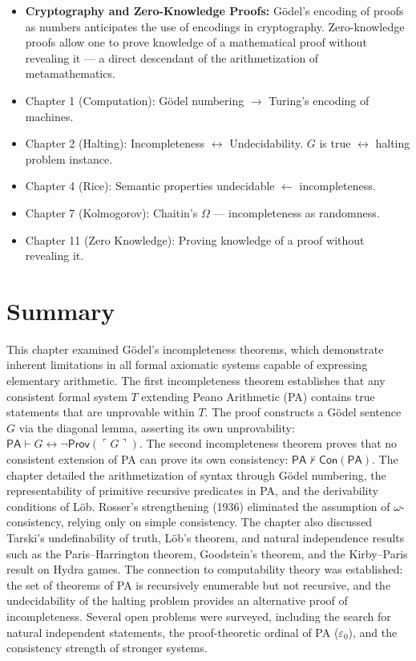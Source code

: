 \begin{itemize}
\item \textbf{Cryptography and Zero-Knowledge Proofs:} Gödel's encoding of proofs as numbers anticipates the use of encodings in cryptography. Zero-knowledge proofs allow one to prove knowledge of a mathematical proof without revealing it --- a direct descendant of the arithmetization of metamathematics.
\end{itemize}

\begin{itemize}
\item Chapter 1 (Computation): Gödel numbering $\to$ Turing's encoding of machines.
\item Chapter 2 (Halting): Incompleteness $\leftrightarrow$ Undecidability. $G$ is true $\leftrightarrow$ halting problem instance.
\item Chapter 4 (Rice): Semantic properties undecidable $\leftarrow$ incompleteness.
\item Chapter 7 (Kolmogorov): Chaitin's $\Omega$ --- incompleteness as randomness.
\item Chapter 11 (Zero Knowledge): Proving knowledge of a proof without revealing it.
\end{itemize}

\section{Summary}
\label{sec:godel:summary}

This chapter examined Gödel's incompleteness theorems, which demonstrate inherent limitations in all formal axiomatic systems capable of expressing elementary arithmetic. The first incompleteness theorem establishes that any consistent formal system $T$ extending Peano Arithmetic (PA) contains true statements that are unprovable within $T$. The proof constructs a Gödel sentence $G$ via the diagonal lemma, asserting its own unprovability: $\mathsf{PA} \vdash G \leftrightarrow \neg \mathsf{Prov}(\ulcorner G \urcorner)$. The second incompleteness theorem proves that no consistent extension of PA can prove its own consistency: $\mathsf{PA} \nvdash \mathsf{Con}(\mathsf{PA})$. The chapter detailed the arithmetization of syntax through Gödel numbering, the representability of primitive recursive predicates in PA, and the derivability conditions of Löb. Rosser's strengthening (1936) eliminated the assumption of $\omega$-consistency, relying only on simple consistency. The chapter also discussed Tarski's undefinability of truth, Löb's theorem, and natural independence results such as the Paris--Harrington theorem, Goodstein's theorem, and the Kirby--Paris result on Hydra games. The connection to computability theory was established: the set of theorems of PA is recursively enumerable but not recursive, and the undecidability of the halting problem provides an alternative proof of incompleteness. Several open problems were surveyed, including the search for natural independent statements, the proof-theoretic ordinal of PA ($\varepsilon_0$), and the consistency strength of stronger systems.


